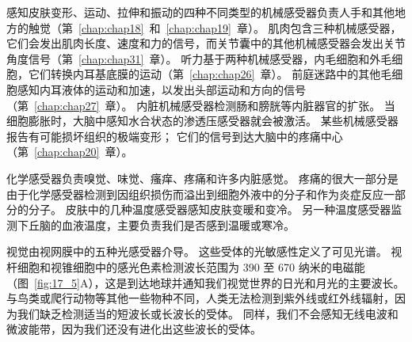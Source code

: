 感知皮肤变形、运动、拉伸和振动的四种不同类型的机械感受器负责人手和其他地方的触觉（第~\ref{chap:chap18}~和~\ref{chap:chap19}~章）。 
肌肉包含三种机械感受器，它们会发出肌肉长度、速度和力的信号，而关节囊中的其他机械感受器会发出关节角度信号（第~\ref{chap:chap31}~章）。 
听力基于两种机械感受器，内毛细胞和外毛细胞，它们转换内耳基底膜的运动（第~\ref{chap:chap26}~章）。 
前庭迷路中的其他毛细胞感知内耳液体的运动和加速，以发出头部运动和方向的信号（第~\ref{chap:chap27}~章）。 
内脏机械感受器检测肠和膀胱等内脏器官的扩张。 
当细胞膨胀时，大脑中感知水合状态的渗透压感受器就会被激活。 
某些机械感受器报告有可能损坏组织的极端变形； 
它们的信号到达大脑中的疼痛中心（第~\ref{chap:chap20}~章）。


化学感受器负责嗅觉、味觉、瘙痒、疼痛和许多内脏感觉。 
疼痛的很大一部分是由于化学感受器检测到因组织损伤而溢出到细胞外液中的分子和作为炎症反应一部分的分子。 
皮肤中的几种温度感受器感知皮肤变暖和变冷。 
另一种温度感受器监测下丘脑的血液温度，主要负责我们是否感到温暖或寒冷。


视觉由视网膜中的五种光感受器介导。 
这些受体的光敏感性定义了可见光谱。 
视杆细胞和视锥细胞中的感光色素检测波长范围为 390 至 670 纳米的电磁能（图~\ref{fig:17_5}A），这是到达地球并通知我们视觉世界的日光和月光的主要波长。 
与鸟类或爬行动物等其他一些物种不同，人类无法检测到紫外线或红外线辐射，因为我们缺乏检测适当的短波长或长波长的受体。 
同样，我们不会感知无线电波和微波能带，因为我们还没有进化出这些波长的受体。


